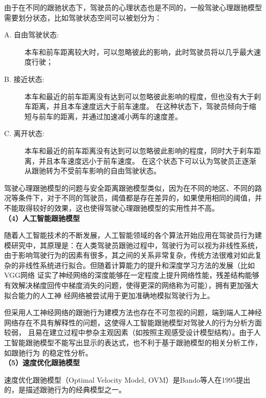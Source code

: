 由于在不同的跟驰状态下，驾驶员的心理状态也是不同的，一般驾驶心理跟驰模型需要划分状态，比如驾驶状态空间可以被划分为：\\

\begin{description}
\item [A. 自由驾驶状态:]
  本车和前车距离较大时，可以忽略彼此的影响，此时驾驶员将以几乎最大速度行驶； \\
\item [B. 接近状态:]
  本车和最近的前车距离没有达到可以忽略彼此影响的程度，但也没有大于刹车距离，并且本车速度远大于前车速度。
  在这种状态下，驾驶员倾向于缩短与前车的距离，并通过加速减小两车的速度差。 \\
\item [C. 离开状态:]
  本车和最近的前车距离没有达到可以忽略彼此影响的程度，同时大于刹车距离，并且本车速度远小于前车速度。
  在这个状态下可以认为驾驶员正逐渐从跟驰转为不受前车影响的自由驾驶状态。
\end{description}  

驾驶心理跟驰模型的问题与安全距离跟驰模型类似，因为在不同的地区、不同的路况等条件下，对于不同的驾驶员，阈值都是存在差异的，如果使用相同的阈值，并不能取得较好的效果，这也使得驾驶心理跟驰模型的实用性并不高。\\

\noindent \textbf{（4）人工智能跟驰模型}

随着人工智能技术的不断发展，人工智能领域的各个算法开始应用在驾驶员行为建模研究中，其原理是：在人类驾驶员跟驰过程中，驾驶行为可以视为非线性系统，
由于影响驾驶行为的因素有很多，其之间的关系非常复杂，传统方法很难对如此复杂的非线性系统进行拟合。但随着计算能力的提升和深度学习方法的发展（比如VGG网络
证实了神经网络的深度能够在一定程度上提升网络性能，残差结构能够有效解决梯度回传中梯度消失的问题，使得更深的网络称为可能），拥有更加强大拟合能力的人工神
经网络被尝试用于更加准确地模拟驾驶行为上。\cite{Kikuchi1992fuzzy}

但采用人工神经网络的跟驰行为建模方法也存在不可忽视的问题，端到端人工神经网络存在不具有解释性的问题，这使得人工智能跟驰模型对驾驶人的行为分析方面较弱，
且易在建立过程中参杂主观因素（如按照主观感受设计模型结构）。由于人工智能跟驰模型不能写出显示的表达式，也不利于基于跟驰模型的相关分析工作，如跟驰行为
的稳定性分析。 \\ 

\noindent \textbf{（5）速度优化跟驰模型}

速度优化跟驰模型（Optimal Velocity Model, OVM）是Bando等人在1995提出的，是描述跟驰行为的经典模型之一。\cite{PhysRevE.51.1035}

